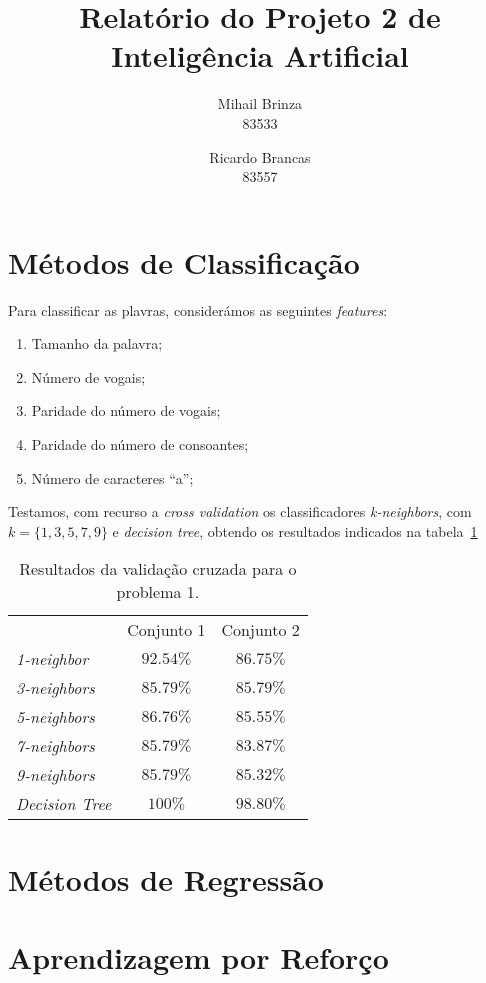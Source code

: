 \documentclass[a4paper,twocolumn]{article}
\title{\LARGE \textbf{Relatório do Projeto 2 de Inteligência Artificial}}
\author{Mihail Brinza \\ \scriptsize 83533 \normalsize \and Ricardo Brancas \\ \scriptsize 83557 \normalsize}
\begin{document}
    \maketitle

    \section{Métodos de Classificação}
    Para classificar as plavras, considerámos as seguintes \textit{features}:
    \begin{enumerate}
        \item Tamanho da palavra;
        \item Número de vogais;
        \item Paridade do número de vogais;
        \item Paridade do número de consoantes;
        \item Número de caracteres ``a'';
    \end{enumerate}
    Testamos, com recurso a \textit{cross validation} os classificadores \textit{k-neighbors}, com $ k = \{1,3,5,7,9\}$
    e \textit{decision tree}, obtendo os resultados indicados na tabela~\ref{tab:cv1}

    \begin{table}[ht]
        \centering
        \begin{tabular}{ l c c }
            & Conjunto 1 & Conjunto 2 \\
         \textit{1-neighbor}  & $92.54\%$ & $86.75\%$ \\
         \textit{3-neighbors} & $85.79\%$ & $85.79\%$ \\
         \textit{5-neighbors} & $86.76\%$ & $85.55\%$ \\
         \textit{7-neighbors} & $85.79\%$ & $83.87\%$ \\
         \textit{9-neighbors} & $85.79\%$ & $85.32\%$ \\
         \textit{Decision Tree} & $100\%$ & $98.80\%$
        \end{tabular}
        \caption{Resultados da validação cruzada para o problema 1.}
        \label{tab:cv1}
    \end{table}

    \section{Métodos de Regressão}

    \section{Aprendizagem por Reforço}
\end{document}
